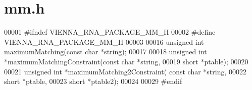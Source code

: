 \hypertarget{mm_8h_source}{}\section{mm.\+h}
\label{mm_8h_source}

\begin{DoxyCode}
00001 \textcolor{preprocessor}{#ifndef VIENNA\_RNA\_PACKAGE\_MM\_H}
00002 \textcolor{preprocessor}{#define VIENNA\_RNA\_PACKAGE\_MM\_H}
00003 
00016 \textcolor{keywordtype}{unsigned} \textcolor{keywordtype}{int}  maximumMatching(\textcolor{keyword}{const} \textcolor{keywordtype}{char} *\textcolor{keywordtype}{string});
00017 
00018 \textcolor{keywordtype}{unsigned} \textcolor{keywordtype}{int} *maximumMatchingConstraint(\textcolor{keyword}{const} \textcolor{keywordtype}{char} *\textcolor{keywordtype}{string},
00019                                         \textcolor{keywordtype}{short} *ptable);
00020 
00021 \textcolor{keywordtype}{unsigned} \textcolor{keywordtype}{int} *maximumMatching2Constraint( \textcolor{keyword}{const} \textcolor{keywordtype}{char} *\textcolor{keywordtype}{string},
00022                                           \textcolor{keywordtype}{short} *ptable,
00023                                           \textcolor{keywordtype}{short} *ptable2);
00024 
00029 \textcolor{preprocessor}{#endif}
\end{DoxyCode}
